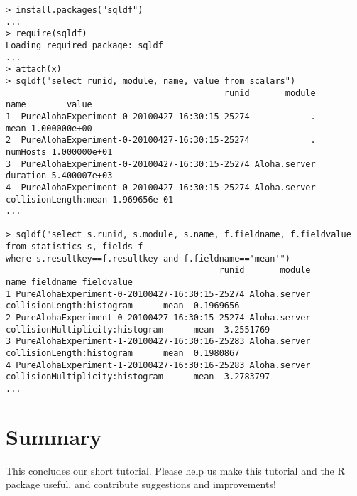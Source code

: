 \begin{verbatim}
> install.packages("sqldf")
...
> require(sqldf)
Loading required package: sqldf
...
> attach(x)
> sqldf("select runid, module, name, value from scalars")
                                           runid       module                    name        value
1  PureAlohaExperiment-0-20100427-16:30:15-25274            .                    mean 1.000000e+00
2  PureAlohaExperiment-0-20100427-16:30:15-25274            .                numHosts 1.000000e+01
3  PureAlohaExperiment-0-20100427-16:30:15-25274 Aloha.server                duration 5.400007e+03
4  PureAlohaExperiment-0-20100427-16:30:15-25274 Aloha.server    collisionLength:mean 1.969656e-01
...

> sqldf("select s.runid, s.module, s.name, f.fieldname, f.fieldvalue from statistics s, fields f
where s.resultkey==f.resultkey and f.fieldname=='mean'")
                                          runid       module                            name fieldname fieldvalue
1 PureAlohaExperiment-0-20100427-16:30:15-25274 Aloha.server       collisionLength:histogram      mean  0.1969656
2 PureAlohaExperiment-0-20100427-16:30:15-25274 Aloha.server collisionMultiplicity:histogram      mean  3.2551769
3 PureAlohaExperiment-1-20100427-16:30:16-25283 Aloha.server       collisionLength:histogram      mean  0.1980867
4 PureAlohaExperiment-1-20100427-16:30:16-25283 Aloha.server collisionMultiplicity:histogram      mean  3.2783797
...
\end{verbatim}

\section{Summary}

This concludes our short tutorial. Please help us make this tutorial and the R package useful,
and contribute suggestions and improvements!



